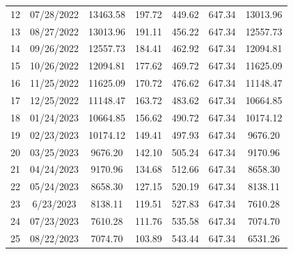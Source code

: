 \documentclass[a4paper,openright,12pt]{book}
\begin{document}
\begin{table}[H]
\begin{tabular}{lcccccc}
12                              & 07/28/2022     & 13463.58       & 197.72           & 449.62                & 647.34         & 13013.96             \\
13                              & 08/27/2022     & 13013.96       & 191.11           & 456.22                & 647.34         & 12557.73             \\
14                              & 09/26/2022     & 12557.73       & 184.41           & 462.92                & 647.34         & 12094.81             \\
15                              & 10/26/2022     & 12094.81       & 177.62           & 469.72                & 647.34         & 11625.09             \\
16                              & 11/25/2022     & 11625.09       & 170.72           & 476.62                & 647.34         & 11148.47             \\
17                              & 12/25/2022     & 11148.47       & 163.72           & 483.62                & 647.34         & 10664.85             \\
18                              & 01/24/2023     & 10664.85       & 156.62           & 490.72                & 647.34         & 10174.12             \\
19                              & 02/23/2023     & 10174.12       & 149.41           & 497.93                & 647.34         & 9676.20              \\
20                              & 03/25/2023     & 9676.20        & 142.10           & 505.24                & 647.34         & 9170.96              \\
21                              & 04/24/2023     & 9170.96        & 134.68           & 512.66                & 647.34         & 8658.30              \\
22                              & 05/24/2023     & 8658.30        & 127.15           & 520.19                & 647.34         & 8138.11              \\
23                              & 6/23/2023      & 8138.11        & 119.51           & 527.83                & 647.34         & 7610.28              \\
24                              & 07/23/2023     & 7610.28        & 111.76           & 535.58                & 647.34         & 7074.70              \\
25                              & 08/22/2023     & 7074.70        & 103.89           & 543.44                & 647.34         & 6531.26             
\end{tabular}
\end{table}
\end{document}
